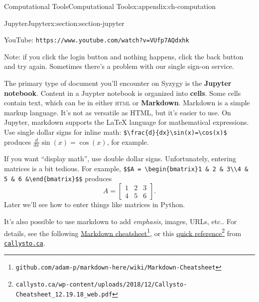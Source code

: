 \documentclass[oneside,10pt,]{book}
\newcommand{\mono}[1]{\texttt{#1}}
\newcommand{\initialism}[1]{\textsc{\MakeLowercase{#1}}}
\newcommand{\terminology}[1]{\textbf{#1}}
\numberwithin{equation}{section}
\newlength{\qrsize}
\newlength{\previewwidth}
\newcommand{\amp}{&}
\begin{document}
\begin{appendixptx}{Computational Tools}{}{Computational Tools}{}{}{x:appendix:ch-computation}
\begin{sectionptx}{Jupyter}{}{Jupyter}{}{}{x:section:section-jupyter}
\begin{tcbraster}[raster columns=2, raster column skip=1pt, raster halign=center, raster force size=false, raster left skip=0pt, raster right skip=0pt]
\begin{tcolorbox}[previewstyle, width=\previewwidth]
\end{tcolorbox}%
\begin{tcolorbox}[qrstyle]%
{\hypersetup{urlcolor=black}}%
\end{tcolorbox}%
\begin{tcolorbox}[captionstyle]%
\small YouTube: \mono{https://www.youtube.com/watch?v=VUfp7AQdxhk}\end{tcolorbox}%
\end{tcbraster}%
Note: if you click the login button and nothing happens, click the back button and try again. Sometimes there's a problem with our single sign-on service.%
\par
The primary type of document you'll encounter on Syzygy is the \terminology{Jupyter notebook}. Content in a Juypter notebook is organized into \terminology{cells}. Some cells contain text, which can be in either \initialism{HTML} or \terminology{Markdown}. Markdown is a simple markup language. It's not as versatile as HTML, but it's easier to use. On Jupyter, markdown supports the LaTeX language for mathematical expressions. Use single dollar signs for inline math: \mono{\$\textbackslash{}frac\{d\}\{dx\}\textbackslash{}sin(x)=\textbackslash{}cos(x)\$} produces \(\frac{d}{dx}\sin(x)=\cos(x)\), for example.%
\par
If you want ``display math'', use double dollar signs. Unfortunately, entering matrices is a bit tedious. For example, \mono{\$\$A = \textbackslash{}begin\{bmatrix\}1 \& 2 \& 3\textbackslash{}\textbackslash{}4 \& 5 \& 6 \&\textbackslash{}end\{bmatrix\}\$\$} produces%
\begin{equation*}
A = \begin{bmatrix}1\amp 2\amp 3\\4\amp 5\amp 6\end{bmatrix}\text{.}
\end{equation*}
Later we'll see how to enter things like matrices in Python.%
\par
It's also possible to use markdown to add \emph{emphasis}, images, URLs, etc.\@. For details, see the following \href{https://github.com/adam-p/markdown-here/wiki/Markdown-Cheatsheet}{Markdown cheatsheet}\footnote{\nolinkurl{github.com/adam-p/markdown-here/wiki/Markdown-Cheatsheet}\label{g:fn:idp139}}, or this \href{https://callysto.ca/wp-content/uploads/2018/12/Callysto-Cheatsheet_12.19.18_web.pdf}{quick reference}\footnote{\nolinkurl{callysto.ca/wp-content/uploads/2018/12/Callysto-Cheatsheet_12.19.18_web.pdf}\label{g:fn:idp140}} from \href{https://callysto.ca/}{\nolinkurl{callysto.ca}}.%

\end{sectionptx}
\end{appendixptx}
\end{document}

